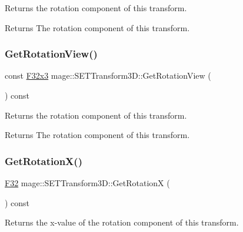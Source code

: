 Returns the rotation component of this transform.

\begin{DoxyReturn}{Returns}
The rotation component of this transform. 
\end{DoxyReturn}
\mbox{\label{classmage_1_1_s_e_t_transform3_d_aa9cef9ce4b9de0b07c80b6efb7e00964}} 
\subsubsection{\texorpdfstring{Get\+Rotation\+View()}{GetRotationView()}}
{\footnotesize\ttfamily const \mbox{\hyperlink{namespacemage_a1e3c7a882af461f161caa1cbddaf1fa2}{F32x3}} mage\+::\+S\+E\+T\+Transform3\+D\+::\+Get\+Rotation\+View (\begin{DoxyParamCaption}{ }\end{DoxyParamCaption}) const\hspace{0.3cm}{\ttfamily [noexcept]}}

Returns the rotation component of this transform.

\begin{DoxyReturn}{Returns}
The rotation component of this transform. 
\end{DoxyReturn}
\mbox{\label{classmage_1_1_s_e_t_transform3_d_ae24e2d17b5366d1fb8a3e04187d17ab7}} 
\subsubsection{\texorpdfstring{Get\+Rotation\+X()}{GetRotationX()}}
{\footnotesize\ttfamily \mbox{\hyperlink{namespacemage_aa97e833b45f06d60a0a9c4fc22ae02c0}{F32}} mage\+::\+S\+E\+T\+Transform3\+D\+::\+Get\+RotationX (\begin{DoxyParamCaption}{ }\end{DoxyParamCaption}) const\hspace{0.3cm}{\ttfamily [noexcept]}}

Returns the x-\/value of the rotation component of this transform.


